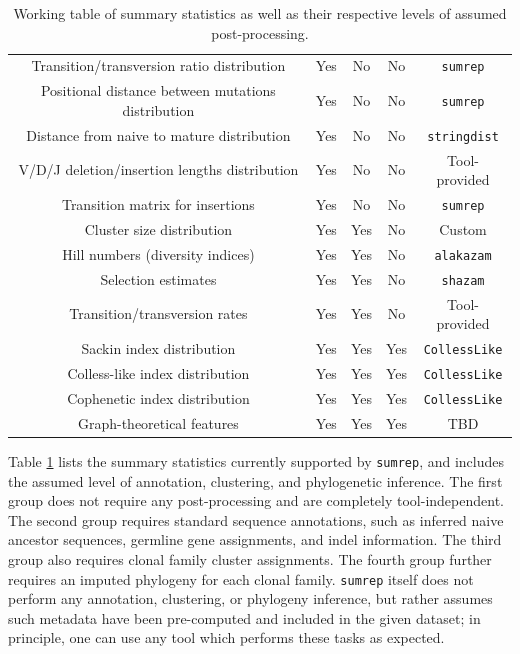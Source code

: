 \documentclass{article}
\begin{document}
\begin{table}
{\begin{tabular}{c|c|c|c|c}
Transition/transversion ratio distribution & Yes & No & No & \texttt{sumrep} \\
Positional distance between mutations distribution & Yes & No & No & \texttt{sumrep}  \\
Distance from naive to mature distribution & Yes & No & No & \texttt{stringdist} \\
V/D/J deletion/insertion lengths distribution & Yes & No & No & Tool-provided \\
Transition matrix for insertions & Yes & No & No & \texttt{sumrep} \\
\hline
Cluster size distribution & Yes & Yes & No & Custom \\
Hill numbers (diversity indices) & Yes & Yes & No & \texttt{alakazam} \\
Selection estimates & Yes & Yes & No & \texttt{shazam} \\
Transition/transversion rates & Yes & Yes & No & Tool-provided \\
\hline
Sackin index distribution & Yes & Yes & Yes & \texttt{CollessLike} \\
Colless-like index distribution & Yes & Yes & Yes & \texttt{CollessLike} \\
Cophenetic index distribution & Yes & Yes & Yes & \texttt{CollessLike} \\
Graph-theoretical features & Yes & Yes & Yes & TBD \\
\end{tabular}
}
\caption{Working table of summary statistics as well as their respective levels of assumed post-processing.}
\label{tab:SummaryStatistics}
\end{table}

Table \ref{tab:SummaryStatistics} lists the summary statistics currently supported by \texttt{sumrep}, and includes the assumed level of annotation, clustering, and phylogenetic inference.
The first group does not require any post-processing and are completely tool-independent.
The second group requires standard sequence annotations, such as inferred naive ancestor sequences, germline gene assignments, and indel information.
The third group also requires clonal family cluster assignments.
The fourth group further requires an imputed phylogeny for each clonal family.
\texttt{sumrep} itself does not perform any annotation, clustering, or phylogeny inference, but rather assumes such metadata have been pre-computed and included in the given dataset; in principle, one can use any tool which performs these tasks as expected.
\end{document}
